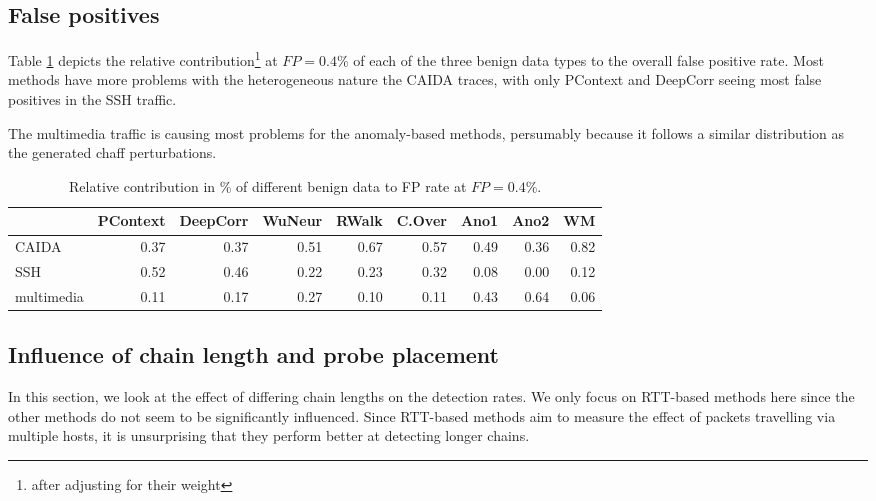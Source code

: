 \documentclass[runningheads]{llncs}\usepackage[]{graphicx}\usepackage[]{color}
\begin{document}


\subsection{False positives}

Table \ref{Tab:dfFP} depicts the relative contribution\footnote{after adjusting for their weight} at $FP=0.4\%$ of each of the three benign data types to the overall false positive rate. Most methods have more problems with the heterogeneous nature the CAIDA traces, with only PContext and DeepCorr seeing most false positives in the SSH traffic. 

The multimedia traffic is causing most problems for the anomaly-based methods, persumably because it follows a similar distribution as the generated chaff perturbations.
\begin{table}
\centering
\begin{tabular}{l|r|r|r|r|r|r|r|r}
  \hline
 & PContext & DeepCorr & WuNeur & RWalk & C.Over & Ano1 & Ano2 & WM \\ 
  \hline
CAIDA & 0.37 & 0.37 & 0.51 & 0.67 & 0.57 & 0.49 & 0.36 & 0.82 \\ 
  SSH & 0.52 & 0.46 & 0.22 & 0.23 & 0.32 & 0.08 & 0.00 & 0.12 \\ 
  multimedia & 0.11 & 0.17 & 0.27 & 0.10 & 0.11 & 0.43 & 0.64 & 0.06 \\ 
   \hline
\end{tabular}

\caption{Relative contribution in \% of different benign data to FP rate at $FP=0.4\%$.}\label{Tab:dfFP}
\end{table}





\subsection{Influence of chain length and probe placement}

In this section, we look at the effect of differing chain lengths on the detection rates. We only focus on RTT-based methods here since the other methods do not seem to be significantly influenced. Since RTT-based methods aim to measure the effect of packets travelling via multiple hosts, it is unsurprising that they perform better at detecting longer chains. 
\end{document}
